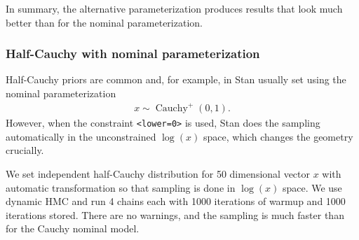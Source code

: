 \documentclass[american,]{article}
\DeclareMathOperator{\Cauchy}{Cauchy}
\begin{document}
In summary, the alternative parameterization produces results that look
much better than for the nominal parameterization.

\hypertarget{half-cauchy-with-nominal-parameterization}{%
\subsubsection{Half-Cauchy with nominal
parameterization}\label{half-cauchy-with-nominal-parameterization}}

Half-Cauchy priors are common and, for example, in Stan usually set
using the nominal parameterization
\begin{align}
  x \sim \Cauchy^+(0,1).
\end{align}
However, when the constraint \texttt{\textless{}lower=0\textgreater{}}
is used, Stan does the sampling automatically in the unconstrained
\(\log(x)\) space, which changes the geometry crucially.

We set independent half-Cauchy distribution for 50 dimensional vector
$x$ with automatic transformation so that sampling is done in
\(\log(x)\) space.  We use dynamic HMC and run 4 chains each with 1000
iterations of warmup and 1000 iterations stored.  There are no
warnings, and the sampling is much faster than for the Cauchy nominal
model.







\end{document}
